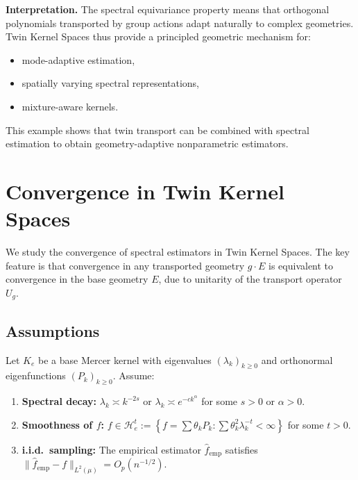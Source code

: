 \documentclass[11pt,a4paper]{article}
\newcommand{\RKHS}{\mathcal{H}}
\begin{document}
\textbf{Interpretation.} The spectral equivariance property means that orthogonal polynomials transported by group actions adapt naturally to complex geometries. Twin Kernel Spaces thus provide a principled geometric mechanism for:
\begin{itemize}
\item mode-adaptive estimation,
\item spatially varying spectral representations,
\item mixture-aware kernels.
\end{itemize}

This example shows that twin transport can be combined with spectral estimation to obtain geometry-adaptive nonparametric estimators.

\section{Convergence in Twin Kernel Spaces}\label{sec:convergence}

We study the convergence of spectral estimators in Twin Kernel Spaces. The key feature is that convergence in any transported geometry $g \cdot E$ is equivalent to convergence in the base geometry $E$, due to unitarity of the transport operator $U_g$.

\subsection{Assumptions}

Let $K_e$ be a base Mercer kernel with eigenvalues $(\lambda_k)_{k \geq 0}$ and orthonormal eigenfunctions $(P_k)_{k \geq 0}$. Assume:

\begin{enumerate}[label=(A\arabic*)]
\item \textbf{Spectral decay:} $\lambda_k \asymp k^{-2s}$ or $\lambda_k \asymp e^{-c k^\alpha}$ for some $s > 0$ or $\alpha > 0$.
\item \textbf{Smoothness of $f$:} $f \in \RKHS_e^t := \left\{ f = \sum \theta_k P_k : \sum \theta_k^2 \lambda_k^{-t} < \infty \right\}$ for some $t > 0$.
\item \textbf{i.i.d.\ sampling:} The empirical estimator $\hat{f}_{\mathrm{emp}}$ satisfies $\|\hat{f}_{\mathrm{emp}} - f\|_{L^2(\mu)} = O_p(n^{-1/2})$.
\end{enumerate}
\end{document}

